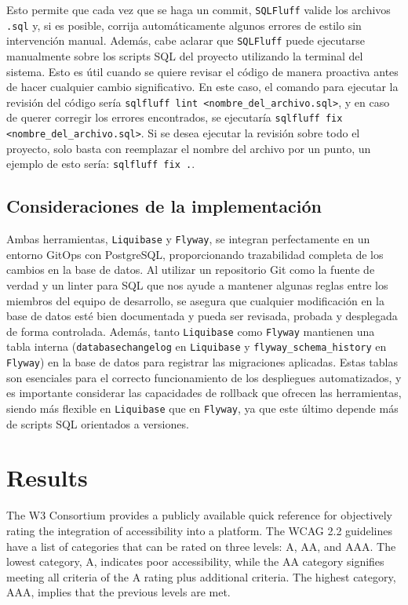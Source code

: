 \documentclass{IEEEtran}
\begin{document}
Esto permite que cada vez que se haga un commit, \texttt{SQLFluff} valide los archivos \texttt{.sql} y, si es posible, corrija automáticamente algunos errores de estilo sin intervención manual. Además, cabe aclarar que \texttt{SQLFluff} puede ejecutarse manualmente sobre los scripts SQL del proyecto utilizando la terminal del sistema. Esto es útil cuando se quiere revisar el código de manera proactiva antes de hacer cualquier cambio significativo. En este caso, el comando para ejecutar la revisión del código sería \texttt{sqlfluff lint <nombre\_del\_archivo.sql>}, y en caso de querer corregir los errores encontrados, se ejecutaría \texttt{sqlfluff fix <nombre\_del\_archivo.sql>}. Si se desea ejecutar la revisión sobre todo el proyecto, solo basta con reemplazar el nombre del archivo por un punto, un ejemplo de esto sería: \texttt{sqlfluff fix .}.

\subsection{Consideraciones de la implementación}

Ambas herramientas, \texttt{Liquibase} y \texttt{Flyway}, se integran perfectamente en un entorno GitOps con PostgreSQL, proporcionando trazabilidad completa de los cambios en la base de datos. Al utilizar un repositorio Git como la fuente de verdad y un linter para SQL que nos ayude a mantener algunas reglas entre los miembros del equipo de desarrollo, se asegura que cualquier modificación en la base de datos esté bien documentada y pueda ser revisada, probada y desplegada de forma controlada. Además, tanto \texttt{Liquibase} como \texttt{Flyway} mantienen una tabla interna (\texttt{databasechangelog} en \texttt{Liquibase} y \texttt{flyway\_schema\_history} en \texttt{Flyway}) en la base de datos para registrar las migraciones aplicadas. Estas tablas son esenciales para el correcto funcionamiento de los despliegues automatizados, y es importante considerar las capacidades de rollback que ofrecen las herramientas, siendo más flexible en \texttt{Liquibase} que en \texttt{Flyway}, ya que este último depende más de scripts SQL orientados a versiones.


\section{Results}
The W3 Consortium provides a publicly available quick reference for objectively rating the integration of accessibility into a platform. The WCAG 2.2 guidelines have a list of categories that can be rated on three levels: A, AA, and AAA. The lowest category, A, indicates poor accessibility, while the AA category signifies meeting all criteria of the A rating plus additional criteria. The highest category, AAA, implies that the previous levels are met.
\end{document}
